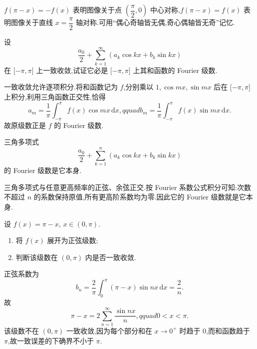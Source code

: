 \begin{remark}
    $f(\pi-x)=-f(x)$ 表明图像关于点 $\left(\dfrac{\pi}{2},0\right)$ 中心对称,$f(\pi-x)=f(x)$ 表明图像关于直线 $x=\dfrac{\pi}{2}$ 轴对称.可用``偶心奇轴皆无偶,奇心偶轴皆无奇''记忆.
\end{remark}

\begin{example}
    设
    \[
        \dfrac{a_0}{2}+\sum\limits_{k=1}^{\infty}(a_k\cos kx+b_k\sin kx)
    \]
    在 $\lbrack -\pi,\pi\rbrack$ 上一致收敛,试证它必是 $\lbrack -\pi,\pi\rbrack$ 上其和函数的 Fourier 级数.
\end{example}
\exampleblank

\begin{solution}
    一致收敛允许逐项积分.将和函数记为 $f$,分别乘以
    $1,\cos mx,\sin mx$ 后在 $\lbrack-\pi,\pi\rbrack$ 上积分,利用三角函数正交性,恰得
    \[
        a_m=\dfrac{1}{\pi}\int_{-\pi}^{\pi}f(x)\cos mx\,\mathrm{d}x,qquad
        b_m=\dfrac{1}{\pi}\int_{-\pi}^{\pi}f(x)\sin mx\,\mathrm{d}x.
    \]
    故原级数正是 $f$ 的 Fourier 级数.
\end{solution}

\begin{example}[\markstar]
    三角多项式
    \[
        \dfrac{a_0}{2}+\sum\limits_{k=1}^{n}(a_k\cos kx+b_k\sin kx)
    \]
    的 Fourier 级数是它本身.
\end{example}
\exampleblank

\begin{solution}
    三角多项式与任意更高频率的正弦、余弦正交.按 Fourier 系数公式积分可知:次数不超过 $n$ 的系数保持原值,所有更高阶系数均为零.因此它的 Fourier 级数就是它本身.
\end{solution}

\begin{example}
    设 $f(x)=\pi-x$, $x\in(0,\pi)$.
    \begin{enumerate}
        \item 将 $f(x)$ 展开为正弦级数;
        \item 判断该级数在 $(0,\pi)$ 内是否一致收敛.
    \end{enumerate}
\end{example}
\exampleblank

\begin{solution}
    正弦系数为
    \[
        b_n=\dfrac{2}{\pi}\int_0^\pi(\pi-x)\sin nx\,\mathrm{d}x=\dfrac{2}{n}.
    \]
    故
    \[
        \pi-x=2\sum\limits_{n=1}^{\infty}\dfrac{\sin nx}{n},qquad0<x<\pi.
    \]
    该级数不在 $(0,\pi)$ 一致收敛,因为每个部分和在 $x\to0^+$ 时趋于 $0$,而和函数趋于 $\pi$,故一致误差的下确界不小于 $\pi$.
\end{solution}

